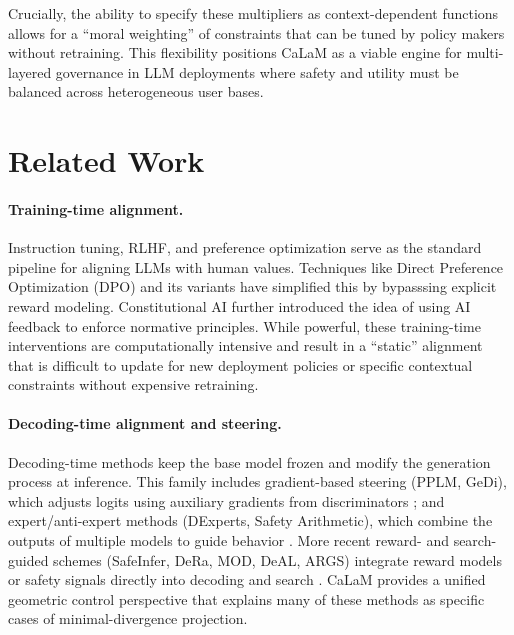 \documentclass{article}
\theoremstyle{plain}
\theoremstyle{definition}
\theoremstyle{remark}
\begin{document}
Crucially, the ability to specify these multipliers as context-dependent functions allows for a ``moral weighting'' of constraints that can be tuned by policy makers without retraining. This flexibility positions CaLaM as a viable engine for multi-layered governance in LLM deployments where safety and utility must be balanced across heterogeneous user bases.

\section{Related Work}
\label{sec:related}

\paragraph{Training-time alignment.}
Instruction tuning, RLHF, and preference optimization \citep{ouyang2022training,bai2022helpful,rafailov2023dpo,cui2024ultrafeedback} serve as the standard pipeline for aligning LLMs with human values. Techniques like Direct Preference Optimization (DPO) and its variants have simplified this by bypasssing explicit reward modeling. Constitutional AI \citep{bai2022constitutional} further introduced the idea of using AI feedback to enforce normative principles. While powerful, these training-time interventions are computationally intensive and result in a ``static'' alignment that is difficult to update for new deployment policies or specific contextual constraints without expensive retraining.

\paragraph{Decoding-time alignment and steering.}
Decoding-time methods keep the base model frozen and modify the generation process at inference. This family includes gradient-based steering (PPLM, GeDi), which adjusts logits using auxiliary gradients from discriminators \citep{dathathri2020plug,krause2021gedi}; and expert/anti-expert methods (DExperts, Safety Arithmetic), which combine the outputs of multiple models to guide behavior \citep{liu2021dexperts,hazra2024safety}. More recent reward- and search-guided schemes (SafeInfer, DeRa, MOD, DeAL, ARGS) integrate reward models or safety signals directly into decoding and search \citep{li2023inference,liu2024dera,shi2024mod,huang2025deal,khanov2024args,hung2025rewardtree}. CaLaM provides a unified geometric control perspective that explains many of these methods as specific cases of minimal-divergence projection.
\end{document}
